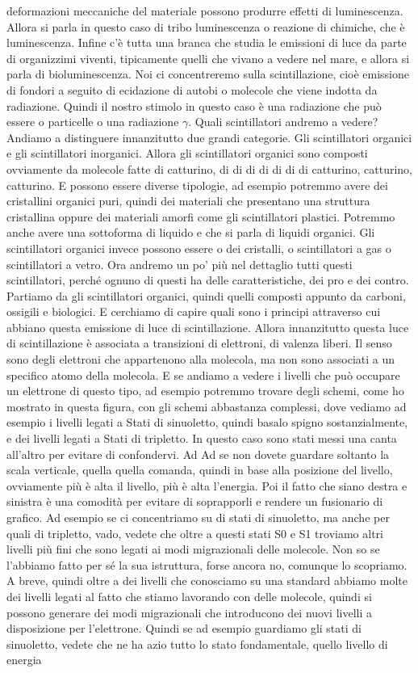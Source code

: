 deformazioni meccaniche del materiale possono produrre effetti di luminescenza. Allora si parla in questo caso di tribo luminescenza o reazione di chimiche, che è luminescenza. Infine c'è tutta una branca che studia le emissioni di luce da parte di organizzimi viventi, tipicamente quelli che vivano a vedere nel mare, e allora si parla di bioluminescenza. Noi ci concentreremo sulla scintillazione, cioè emissione di fondori a seguito di ecidazione di autobi o molecole che viene indotta da radiazione. Quindi il nostro stimolo in questo caso è una radiazione che può essere o particelle o una radiazione $\gamma$. Quali scintillatori andremo a vedere? Andiamo a distinguere innanzitutto due grandi categorie. Gli scintillatori organici e gli scintillatori inorganici. Allora gli scintillatori organici sono composti ovviamente da molecole fatte di catturino, di di di di di di di catturino, catturino, catturino. E possono essere diverse tipologie, ad esempio potremmo avere dei cristallini organici puri, quindi dei materiali che presentano una struttura cristallina oppure dei materiali amorfi come gli scintillatori plastici. Potremmo anche avere una sottoforma di liquido e che si parla di liquidi organici. Gli scintillatori organici invece possono essere o dei cristalli, o scintillatori a gas o scintillatori a vetro. Ora andremo un po' più nel dettaglio tutti questi scintillatori, perché ognuno di questi ha delle caratteristiche, dei pro e dei contro. Partiamo da gli scintillatori organici, quindi quelli composti appunto da carboni, ossigili e biologici. E cerchiamo di capire quali sono i principi attraverso cui abbiano questa emissione di luce di scintillazione. Allora innanzitutto questa luce di scintillazione è associata a transizioni di elettroni, di valenza liberi. Il senso sono degli elettroni che appartenono alla molecola, ma non sono associati a un specifico atomo della molecola. E se andiamo a vedere i livelli che può occupare un elettrone di questo tipo, ad esempio potremmo trovare degli schemi, come ho mostrato in questa figura, con gli schemi abbastanza complessi, dove vediamo ad esempio i livelli legati a Stati di sinuoletto, quindi basalo spigno sostanzialmente, e dei livelli legati a Stati di tripletto. In questo caso sono stati messi una canta all'altro per evitare di confondervi. Ad Ad se non dovete guardare soltanto la scala verticale, quella quella comanda, quindi in base alla posizione del livello, ovviamente più è alta il livello, più è alta l'energia. Poi il fatto che siano destra e sinistra è una comodità per evitare di soprapporli e rendere un fusionario di grafico. Ad esempio se ci concentriamo su di stati di sinuoletto, ma anche per quali di tripletto, vado, vedete che oltre a questi stati S0 e S1 troviamo altri livelli più fini che sono legati ai modi migrazionali delle molecole. Non so se l'abbiamo fatto per sé la sua istruttura, forse ancora no, comunque lo scopriamo. A breve, quindi oltre a dei livelli che conosciamo su una standard abbiamo molte dei livelli legati al fatto che stiamo lavorando con delle molecole, quindi si possono generare dei modi migrazionali che introducono dei nuovi livelli a disposizione per l'elettrone. Quindi se ad esempio guardiamo gli stati di sinuoletto, vedete che ne ha azio tutto lo stato fondamentale, quello livello di energia 